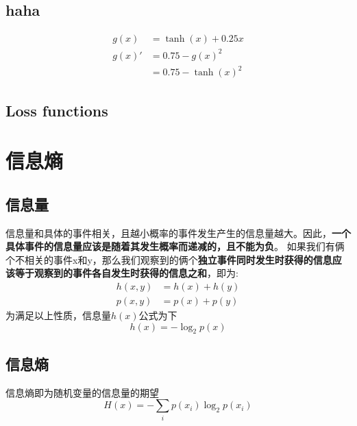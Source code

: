 \subsection{haha}

\begin{equation}
    \begin{split}
        g(x) &= \tanh(x) + 0.25x \\
        g(x)' &= 0.75 - g(x)^2 \\ &= 0.75 - \tanh(x)^2
    \end{split}
\end{equation}

\subsection{Loss functions}



\section{信息熵}
\subsection{信息量}
信息量和具体的事件相关，且越小概率的事件发生产生的信息量越大。因此，\textbf{一个具体事件的信息量应该是随着其发生概率而递减的，且不能为负}。
如果我们有俩个不相关的事件x和y，那么我们观察到的俩个\textbf{独立事件同时发生时获得的信息应该等于观察到的事件各自发生时获得的信息之和}，即为:
\begin{equation}
    \begin{split}
        h(x, y) &= h(x) + h(y) \\
        p(x, y) &= p(x) + p(y)
    \end{split}
\end{equation}
为满足以上性质，信息量$h(x)$公式为下
\begin{equation}
    h(x) = -\log_2p(x)
\end{equation}
\subsection{信息熵}
信息熵即为随机变量的信息量的期望
\begin{equation}
    H(x) = -\sum_ip(x_i)\log_2p(x_i)
\end{equation}
